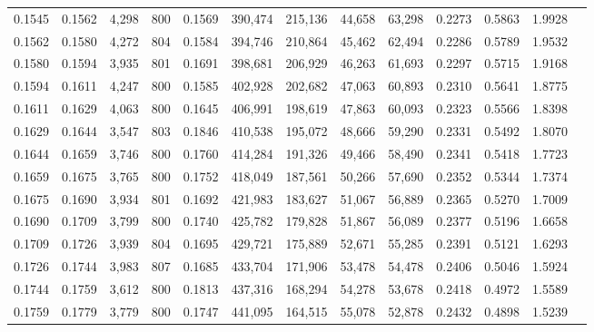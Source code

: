 \begin{tabular}{rrrrrrrrrrrrr}
0.1545 & 0.1562 &  4,298 & 800 &                                     0.1569 & 390,474 & 215,136 &  44,658 &  63,298 & 0.2273 & 0.5863 & 1.9928 \\
0.1562 & 0.1580 &  4,272 & 804 &                                     0.1584 & 394,746 & 210,864 &  45,462 &  62,494 & 0.2286 & 0.5789 & 1.9532 \\
0.1580 & 0.1594 &  3,935 & 801 &                                     0.1691 & 398,681 & 206,929 &  46,263 &  61,693 & 0.2297 & 0.5715 & 1.9168 \\
0.1594 & 0.1611 &  4,247 & 800 &                                     0.1585 & 402,928 & 202,682 &  47,063 &  60,893 & 0.2310 & 0.5641 & 1.8775 \\
0.1611 & 0.1629 &  4,063 & 800 &                                     0.1645 & 406,991 & 198,619 &  47,863 &  60,093 & 0.2323 & 0.5566 & 1.8398 \\
0.1629 & 0.1644 &  3,547 & 803 &                                     0.1846 & 410,538 & 195,072 &  48,666 &  59,290 & 0.2331 & 0.5492 & 1.8070 \\
0.1644 & 0.1659 &  3,746 & 800 &                                     0.1760 & 414,284 & 191,326 &  49,466 &  58,490 & 0.2341 & 0.5418 & 1.7723 \\
0.1659 & 0.1675 &  3,765 & 800 &                                     0.1752 & 418,049 & 187,561 &  50,266 &  57,690 & 0.2352 & 0.5344 & 1.7374 \\
0.1675 & 0.1690 &  3,934 & 801 &                                     0.1692 & 421,983 & 183,627 &  51,067 &  56,889 & 0.2365 & 0.5270 & 1.7009 \\
0.1690 & 0.1709 &  3,799 & 800 &                                     0.1740 & 425,782 & 179,828 &  51,867 &  56,089 & 0.2377 & 0.5196 & 1.6658 \\
0.1709 & 0.1726 &  3,939 & 804 &                                     0.1695 & 429,721 & 175,889 &  52,671 &  55,285 & 0.2391 & 0.5121 & 1.6293 \\
0.1726 & 0.1744 &  3,983 & 807 &                                     0.1685 & 433,704 & 171,906 &  53,478 &  54,478 & 0.2406 & 0.5046 & 1.5924 \\
0.1744 & 0.1759 &  3,612 & 800 &                                     0.1813 & 437,316 & 168,294 &  54,278 &  53,678 & 0.2418 & 0.4972 & 1.5589 \\
0.1759 & 0.1779 &  3,779 & 800 &                                     0.1747 & 441,095 & 164,515 &  55,078 &  52,878 & 0.2432 & 0.4898 & 1.5239 \\

\end{tabular}
